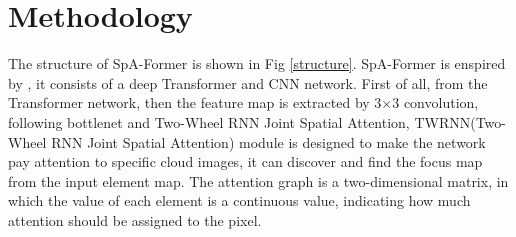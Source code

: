 \documentclass[journal]{IEEEtran}
\begin{document}
\section{Methodology}
 The structure of SpA-Former is shown in Fig \ref{structure}.  SpA-Former is enspired by \cite{18,19}, it consists of a deep Transformer and CNN network. First of all, from the Transformer network, then the feature map is extracted by 3$\times$3 convolution, following bottlenet and Two-Wheel RNN Joint Spatial Attention, TWRNN(Two-Wheel RNN Joint Spatial Attention) module is designed to make the network pay attention to specific cloud images, it can discover and find the focus map from the input element map. The attention graph is a two-dimensional matrix, in which the value of each element is a continuous value, indicating how much attention should be assigned to the pixel.
\end{document}

